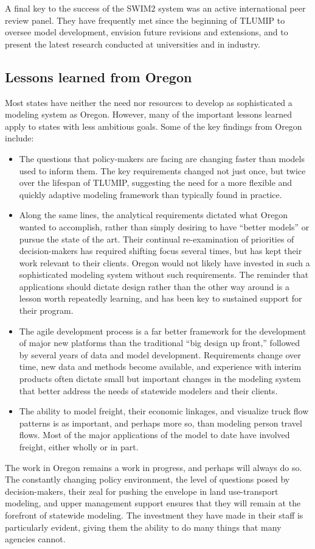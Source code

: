 A final key to the success of the SWIM2 system was an active international peer review panel. They have frequently met since the beginning of TLUMIP to oversee model development, envision future revisions and extensions, and to present the latest research conducted at universities and in industry.

\subsection{Lessons learned from Oregon}

Most states have neither the need nor resources to develop as sophisticated a modeling system as Oregon. However, many of the important lessons learned apply to states with less ambitious goals. Some of the key findings from Oregon include:

\begin{itemize}
\item
The questions that policy-makers are facing are changing faster than models used to inform them. The key requirements changed not just once, but twice over the lifespan of TLUMIP, suggesting the need for a more flexible and quickly adaptive modeling framework than typically found in practice.
\item
Along the same lines, the analytical requirements dictated what Oregon wanted to accomplish, rather than simply desiring to have ``better models'' or pursue the state of the art. Their continual re-examination of priorities of decision-makers has required shifting focus several times, but has kept their work relevant to their clients. Oregon would not likely have invested in such a sophisticated modeling system without such requirements. The reminder that applications should dictate design rather than the other way around is a lesson worth repeatedly learning, and has been key to sustained support for their program.
\item
The agile development process is a far better framework for the development of major new platforms than the traditional ``big design up front,'' followed by several years of data and model development. Requirements change over time, new data and methods become available, and experience with interim products often dictate small but important changes in the modeling system that better address the needs of statewide modelers and their clients.
\item
The ability to model freight, their economic linkages, and visualize truck flow patterns is as important, and perhaps more so, than modeling person travel flows. Most of the major applications of the model to date have involved freight, either wholly or in part.
\end{itemize}

The work in Oregon remains a work in progress, and perhaps will always do so. The constantly changing policy environment, the level of questions posed by decision-makers, their zeal for pushing the envelope in land use-transport modeling, and upper management support ensures that they will remain at the forefront of statewide modeling. The investment they have made in their staff is particularly evident, giving them the ability to do many things that many agencies cannot.
